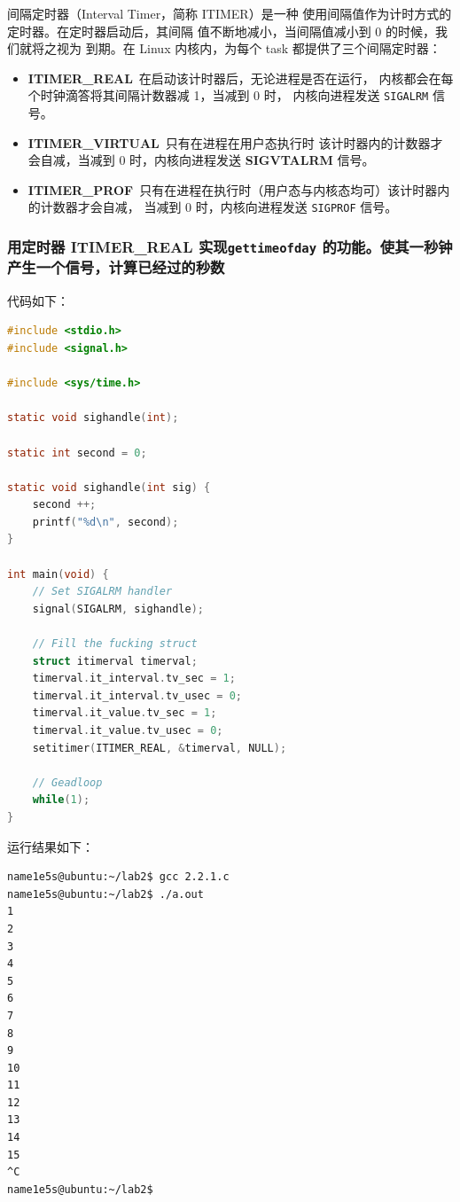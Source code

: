 \documentclass[blue,normal,cn]{elegantnote}
\newcommand{\code}[1]{\colorbox{light-gray}{\texttt{#1}}}
\begin{document}
间隔定时器（Interval Timer，简称 ITIMER）是一种
使用间隔值作为计时方式的定时器。在定时器启动后，其间隔
值不断地减小，当间隔值减小到  0 的时候，我们就将之视为
到期。在 Linux 内核内，为每个 task 都提供了三个间隔定时器：

\begin{itemize}
  \item \textbf{ITIMER\_REAL}\ 在启动该计时器后，无论进程是否在运行，
  内核都会在每个时钟滴答将其间隔计数器减 1，当减到 0 时，
  内核向进程发送 \code{SIGALRM} 信号。  
  \item \textbf{ITIMER\_VIRTUAL}\ 只有在进程在用户态执行时
  该计时器内的计数器才会自减，当减到 0 时，内核向进程发送 \textbf{SIGVTALRM}
  信号。
  \item \textbf{ITIMER\_PROF}\ 只有在进程在执行时（用户态与内核态均可）该计时器内的计数器才会自减，
  当减到 0 时，内核向进程发送 \code{SIGPROF} 信号。
\end{itemize}

\subsubsection{用定时器 \textbf{ITIMER\_REAL} 实现\code{gettimeofday}
的功能。使其一秒钟产生一个信号，计算已经过的秒数}

代码如下：
\begin{lstlisting}[language=C]
#include <stdio.h>
#include <signal.h>

#include <sys/time.h>

static void sighandle(int);

static int second = 0;

static void sighandle(int sig) {
    second ++;
    printf("%d\n", second);
}

int main(void) {
    // Set SIGALRM handler
    signal(SIGALRM, sighandle);

    // Fill the fucking struct
    struct itimerval timerval;
	timerval.it_interval.tv_sec = 1;
	timerval.it_interval.tv_usec = 0;
	timerval.it_value.tv_sec = 1;
	timerval.it_value.tv_usec = 0;
    setitimer(ITIMER_REAL, &timerval, NULL);
    
    // Geadloop
    while(1);
}
\end{lstlisting}

运行结果如下：
\begin{lstlisting}
name1e5s@ubuntu:~/lab2$ gcc 2.2.1.c
name1e5s@ubuntu:~/lab2$ ./a.out
1
2
3
4
5
6
7
8
9
10
11
12
13
14
15
^C
name1e5s@ubuntu:~/lab2$
\end{lstlisting}
\end{document}
